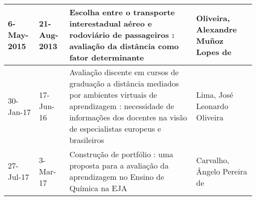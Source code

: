 \begin{table}
{\begin{tabular}{|m{1.3cm}|m{1.3cm}|p{7cm}|p{6cm}|}
6-May-2015  & 21-Aug-2013 & Escolha entre o transporte interestadual aéreo e rodoviário de passageiros : avaliação da distância como fator determinante                                                                                           & Oliveira, Alexandre Muñoz Lopes de                                                                                                                                                                                                                           \\ \hline
30-Jan-17   & 17-Jun-16   & Avaliação discente em cursos de graduação a distância mediados por ambientes virtuais de aprendizagem : necessidade de informações dos docentes na visão de especialistas europeus e brasileiros                      & Lima, José Leonardo Oliveira                                                                                                                                                                                                                                 \\ \hline
27-Jul-17   & 3-Mar-17    & Construção de portfólio : uma proposta para a avaliação da aprendizagem no Ensino de Química na EJA                                                                                                                   & Carvalho, Ângelo Pereira de                                                                                                                                                                                                                                  \\ \hline
\end{tabular}}
\end{table}





